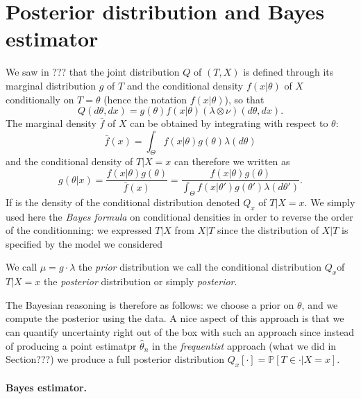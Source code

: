 \documentclass[
	fontsize=11pt, %
	twoside=false, %
	numbers=noenddot, %
]{kaobook}
\renewcommand{\P}{\mathbb P}
\newcommand{\wh}{\widehat}
\begin{document}
\section{Posterior distribution and Bayes estimator} %
\label{sec:posterior_distribution_and_bayes_estimator}

We saw in ??? that the joint distribution $Q$ of $(T, X)$ is defined through its marginal distribution $g$ of $T$ and the conditional density $f(x | \theta)$ of $X$ conditionally on $T = \theta$ (hence the notation $f(x | \theta)$), so that
\begin{equation*}
	Q(d \theta, dx) = g(\theta) f(x | \theta) (\lambda \otimes \nu) (d\theta, dx). 	
\end{equation*} 
The marginal density $\bar f$ of $X$ can be obtained by integrating with respect to $\theta$:
\begin{equation*}
	\bar f(x) = \int_{\Theta} f(x | \theta) g(\theta) \lambda(d \theta)
\end{equation*}
and the conditional density of $T | X = x$ can therefore we written as
\begin{equation*}
	g(\theta | x) = \frac{f(x | \theta) g(\theta)}{\bar f(x)} = \frac{f(x | \theta) g(\theta)}{\int_{\Theta} f(x | \theta') g(\theta') \lambda(d \theta')}.
\end{equation*}
If is the density of the conditional distribution denoted $Q_x$ of $T | X = x$.
We simply used here the \emph{Bayes formula} on conditional densities in order to reverse the order of the conditionning: we expressed $T | X$ from $X | T$ since the distribution of $X | T$ is specified by the model we considered

\begin{definition}
	We call $\mu = g \cdot \lambda$ the \emph{prior} distribution we call the conditional distribution $Q_x$of $T | X=x$ the \emph{posterior} distribution or simply \emph{posterior}.
\end{definition}

The Bayesian reasoning is therefore as follows: we choose a prior on $\theta$, and we compute the posterior using the data. 
A nice aspect of this approach is that we can quantify uncertainty right out of the box with such an approach since instead of producing a point estimatpr $\wh \theta_n$ in the \emph{frequentist} approach (what we did in Section???) we produce a full posterior distribution $Q_x[\cdot] = \P[T \in \cdot | X = x]$.

\paragraph{Bayes estimator.} %
\end{document}
